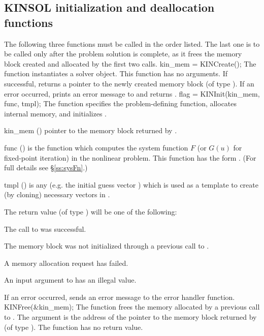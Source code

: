 
\subsection{KINSOL initialization and deallocation functions}
\label{sss:kinmalloc}

The following three functions must be called in the order listed. The last one
is to be called only after the problem solution is complete, as it frees the
{\kinsol} memory block created and allocated by the first two calls.
{
  kin\_mem = KINCreate();
}
{
  The function  instantiates a {\kinsol} solver object.
}
{
  This function has no arguments.
}
{
  If successful,  returns a pointer to the newly created
  {\kinsol} memory block (of type ).
  If an error occurred,  prints an error message to 
  and returns .
}
{}
{
flag = KINInit(kin\_mem, func, tmpl);
}
{
  The function  specifies the problem-defining
  function, allocates internal memory, and initializes {\kinsol}.
}
{
  \begin{args}
  \item[kin\_mem] ()
    pointer to the {\kinsol} memory block returned by .
  \item[func] ()
    is the {\CC} function which computes the system function $F$
    (or $G(u)$ for fixed-point iteration) in the nonlinear
    problem.  This function has the form .
    (For full details see \S\ref{ss:sysFn}.)
  \item[tmpl] ()
    is any  (e.g. the initial guess vector ) which is used
    as a template to create (by cloning) necessary vectors in .
  \end{args}
}
{
  The return value  (of type ) will be one of the following:
  \begin{args}
  \item[\Id{KIN\_SUCCESS}]
    The call to  was successful.
  \item[\Id{KIN\_MEM\_NULL}]
    The {\kinsol} memory block was not initialized through a previous call
    to .
  \item[\Id{KIN\_MEM\_FAIL}]
    A memory allocation request has failed.
  \item[\Id{KIN\_ILL\_INPUT}]
    An input argument to  has an illegal value.
  \end{args}
}
{
  If an error occurred,  sends an error message to the
  error handler function.
}
{
  KINFree(\&kin\_mem);
}
{
  The function  frees the memory allocated by
  a previous call to .
}
{
  The argument is the address of the pointer to the {\kinsol} memory block
  returned by  (of type ).
}
{
  The function  has no return value.
}
{}

